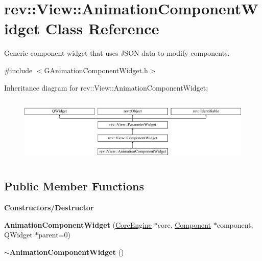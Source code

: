 \hypertarget{classrev_1_1_view_1_1_animation_component_widget}{}\section{rev\+::View\+::Animation\+Component\+Widget Class Reference}
\label{classrev_1_1_view_1_1_animation_component_widget}


Generic component widget that uses J\+S\+ON data to modify components.  




{\ttfamily \#include $<$G\+Animation\+Component\+Widget.\+h$>$}

Inheritance diagram for rev\+::View\+::Animation\+Component\+Widget\+:\begin{figure}[H]
\begin{center}
\leavevmode
\includegraphics[height=3.177305cm]{classrev_1_1_view_1_1_animation_component_widget}
\end{center}
\end{figure}
\subsection*{Public Member Functions}
\begin{Indent}\textbf{ Constructors/\+Destructor}\par
\begin{DoxyCompactItemize}
\item 
\mbox{\label{classrev_1_1_view_1_1_animation_component_widget_a16069933a62f681ba91682f8e1955c6c}} 
{\bfseries Animation\+Component\+Widget} (\mbox{\hyperlink{classrev_1_1_core_engine}{Core\+Engine}} $\ast$core, \mbox{\hyperlink{classrev_1_1_component}{Component}} $\ast$component, Q\+Widget $\ast$parent=0)
\item 
\mbox{\label{classrev_1_1_view_1_1_animation_component_widget_a3f6a202e0357f8d9683a72114c866b5c}} 
{\bfseries $\sim$\+Animation\+Component\+Widget} ()
\end{DoxyCompactItemize}
\end{Indent}
